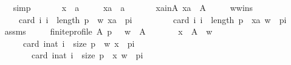 \begin{isabellebody}
\ \ \ \ \isamarkupfalse%
\ simp\isanewline
{}\isamarkupfalse%
\isanewline
\ \ \isamarkupfalse%
\isanewline
\ \ \ \ x\ {\isacharcolon}{\kern0pt}{\isacharcolon}{\kern0pt}\ {\isachardoublequoteopen}{\isacharprime}{\kern0pt}a{\isachardoublequoteclose}\ \isanewline
\ \ \ \ xa\ {\isacharcolon}{\kern0pt}{\isacharcolon}{\kern0pt}\ {\isachardoublequoteopen}{\isacharprime}{\kern0pt}a{\isachardoublequoteclose}\isanewline
\ \ \isamarkupfalse%
\isanewline
\ \ \ \ xa{\isacharunderscore}{\kern0pt}in{\isacharunderscore}{\kern0pt}A{\isacharcolon}{\kern0pt}\ {\isachardoublequoteopen}xa\ {\isasymin}\ A{\isachardoublequoteclose}\ \isanewline
\ \ \ \ w{\isacharunderscore}{\kern0pt}wins{\isacharcolon}{\kern0pt}\isanewline
\ \ \ \ \ \ {\isachardoublequoteopen}{\isasymnot}\ card\ {\isacharbraceleft}{\kern0pt}i{\isachardot}{\kern0pt}\ i\ {\isacharless}{\kern0pt}\ length\ p\ {\isasymand}\ {\isacharparenleft}{\kern0pt}w{\isacharcomma}{\kern0pt}\ xa{\isacharparenright}{\kern0pt}\ {\isasymin}\ p{\isacharbang}{\kern0pt}i{\isacharbraceright}{\kern0pt}\ {\isacharless}{\kern0pt}\isanewline
\ \ \ \ \ \ \ \ card\ {\isacharbraceleft}{\kern0pt}i{\isachardot}{\kern0pt}\ i\ {\isacharless}{\kern0pt}\ length\ p\ {\isasymand}\ {\isacharparenleft}{\kern0pt}xa{\isacharcomma}{\kern0pt}\ w{\isacharparenright}{\kern0pt}\ {\isasymin}\ p{\isacharbang}{\kern0pt}i{\isacharbraceright}{\kern0pt}{\isachardoublequoteclose}\isanewline
\ \ \isamarkupfalse%
\ assms\ \isamarkupfalse%
\isanewline
\ \ \ \ {\isachardoublequoteopen}finite{\isacharunderscore}{\kern0pt}profile\ A\ p\ {\isasymand}\ \ w\ {\isasymin}\ A\ {\isasymand}\isanewline
\ \ \ \ \ \ {\isacharparenleft}{\kern0pt}{\isasymforall}x\ {\isasymin}\ A\ {\isacharminus}{\kern0pt}\ {\isacharbraceleft}{\kern0pt}w{\isacharbraceright}{\kern0pt}\ {\isachardot}{\kern0pt}\isanewline
\ \ \ \ \ \ \ \ card\ {\isacharbraceleft}{\kern0pt}i{\isacharcolon}{\kern0pt}{\isacharcolon}{\kern0pt}nat{\isachardot}{\kern0pt}\ i\ {\isacharless}{\kern0pt}\ size\ p\ {\isasymand}\ {\isacharparenleft}{\kern0pt}w{\isacharcomma}{\kern0pt}\ x{\isacharparenright}{\kern0pt}\ {\isasymin}\ p{\isacharbang}{\kern0pt}i{\isacharbraceright}{\kern0pt}\ {\isacharless}{\kern0pt}\isanewline
\ \ \ \ \ \ \ \ \ \ card\ {\isacharbraceleft}{\kern0pt}i{\isacharcolon}{\kern0pt}{\isacharcolon}{\kern0pt}nat{\isachardot}{\kern0pt}\ i\ {\isacharless}{\kern0pt}\ size\ p\ {\isasymand}\ {\isacharparenleft}{\kern0pt}x{\isacharcomma}{\kern0pt}\ w{\isacharparenright}{\kern0pt}\ {\isasymin}\ p{\isacharbang}{\kern0pt}i{\isacharbraceright}{\kern0pt}{\isacharparenright}{\kern0pt}{\isachardoublequoteclose}\isanewline

\end{isabellebody}
